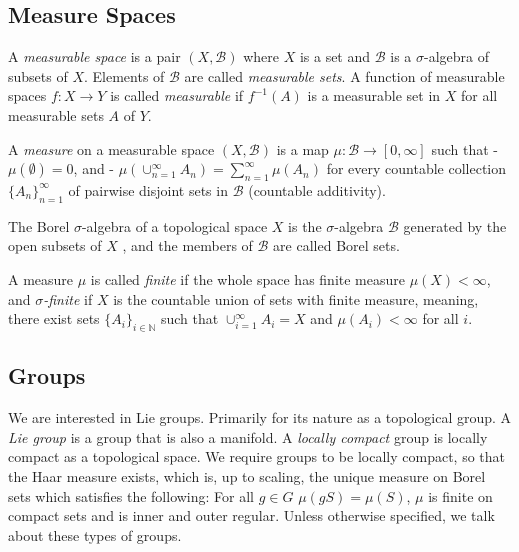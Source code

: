 \documentclass[
]{article}
\theoremstyle{break}
\theoremstyle{plain}
\begin{document}
\hypertarget{measure-spaces}{%
\subsection{Measure Spaces}\label{measure-spaces}}

A \emph{measurable space} is a pair $(X, \mathscr{B})$ where $X$ is
a set and $\mathscr{B}$ is a $\sigma$-algebra of subsets of $X$.
Elements of $\mathscr{B}$ are called \emph{measurable sets}. A
function of measurable spaces $f: X \rightarrow Y$ is called
\emph{measurable} if $f^{-1}(A)$ is a measurable set in $X$ for all
measurable sets $A$ of $Y$.

A \emph{measure} on a measurable space $(X, \mathscr{B})$ is a map
$\mu: \mathscr{B} \rightarrow [0, \infty]$ such that -
$\mu(\emptyset) = 0$, and -
$\mu(\cup_{n=1}^{\infty} A_n) = \sum_{n=1}^{\infty} \mu(A_n)$ for
every countable collection $\{A_n\}_{n=1}^{\infty}$ of pairwise
disjoint sets in $\mathscr{B}$ (countable additivity).

The Borel $\sigma$-algebra of a topological space $X$ is the
$\sigma$-algebra $\mathscr{B}$ generated by the open subsets of
$X$ , and the members of $\mathscr{B}$ are called Borel sets. 

A measure $\mu$ is called \emph{finite} if the whole space has finite measure $\mu(X) < \infty $,
and \emph{$\sigma$-finite} if $X$ is the countable union of sets with finite measure,
meaning, there exist sets $\{A_i\}_{i\in \mathbb{N}}$ such that $\cup_{i=1}^{\infty} A_i = X$ and
$\mu(A_i) < \infty $ for all $i$.




\hypertarget{groups}{%
\subsection{Groups}\label{groups}}

We are interested in Lie groups. Primarily for its nature as a topological group.
A \emph{ Lie group } is a group that is also a manifold. A \emph{locally compact} group
is locally compact as a topological space.
We require groups to be locally compact, so that the Haar measure exists, which is, up to scaling,
the unique measure on Borel sets which satisfies the following: For all $g\in G$
$\mu(gS) = \mu(S)$, $\mu$ is finite on compact sets and is inner and outer
regular.
Unless otherwise specified, we talk about these types of groups.
\end{document}
